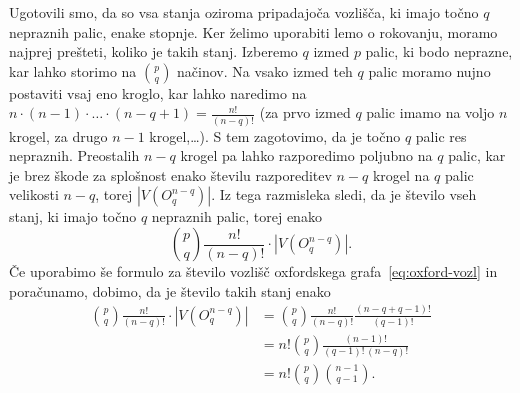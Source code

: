 \documentclass[12pt,a4paper]{amsart}
\theoremstyle{definition} %
\theoremstyle{plain} %
\begin{document}
    Ugotovili smo, da so vsa stanja oziroma pripadajoča vozlišča, ki imajo točno $q$ nepraznih palic, enake stopnje. Ker želimo uporabiti lemo o rokovanju, moramo najprej prešteti, koliko je takih stanj. 
    Izberemo $q$ izmed $p$ palic, ki bodo neprazne, kar lahko storimo na ${p \choose q}$ načinov. Na vsako izmed teh $q$ palic moramo nujno postaviti vsaj eno kroglo, kar lahko naredimo na $n \cdot (n-1) \cdot \ldots \cdot (n-q+1) = \frac{n!}{(n-q)!}$ (za prvo izmed $q$ palic imamo na voljo $n$ krogel, za drugo $n-1$ krogel,\ldots). S tem zagotovimo, da je točno $q$ palic res nepraznih. Preostalih $n-q$ krogel pa lahko razporedimo poljubno na $q$ palic, kar je brez škode za splošnost enako številu razporeditev $n-q$ krogel na $q$ palic velikosti $n-q$, torej $|V(O^{n-q}_q)|$.
    Iz tega razmisleka sledi, da je število vseh stanj, ki imajo točno $q$ nepraznih palic, torej enako
    \[{p \choose q} \frac{n!}{(n-q)!} \cdot |V(O^{n-q}_q)|.\]
    Če uporabimo še formulo za število vozlišč oxfordskega grafa~\eqref{eq:oxford-vozl} in poračunamo, dobimo, da je število takih stanj enako
    \begin{align*}
        {p \choose q} \frac{n!}{(n-q)!} \cdot |V(O^{n-q}_q)| &=
        {p \choose q} \frac{n!}{(n-q)!} \frac{(n-q+q-1)!}{(q-1)!} \\ &= n! {p \choose q} \frac{(n-1)!}{(q-1)!\,(n-q)!} \\ &=
        n! {p \choose q} {n-1 \choose q-1}.
    \end{align*}
\end{document}

